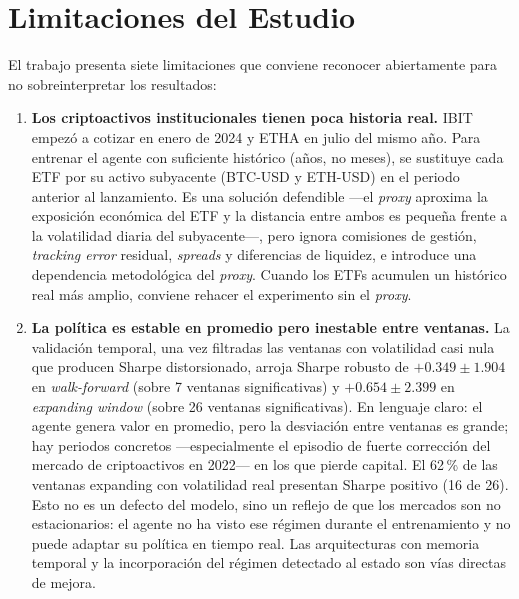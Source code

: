 \documentclass[IB,a4paper]{TFUOC}
\begin{document}
\section{Limitaciones del Estudio}
\label{sec:conclusiones_limitaciones}

El trabajo presenta siete limitaciones que conviene reconocer abiertamente para no sobreinterpretar los resultados:

\begin{enumerate}
    \item \textbf{Los criptoactivos institucionales tienen poca historia real.} IBIT empezó a cotizar en enero de 2024 y ETHA en julio del mismo año. Para entrenar el agente con suficiente histórico (años, no meses), se sustituye cada ETF por su activo subyacente (BTC-USD y ETH-USD) en el periodo anterior al lanzamiento. Es una solución defendible ---el \textit{proxy} aproxima la exposición económica del ETF y la distancia entre ambos es pequeña frente a la volatilidad diaria del subyacente---, pero ignora comisiones de gestión, \textit{tracking error} residual, \textit{spreads} y diferencias de liquidez, e introduce una dependencia metodológica del \textit{proxy}. Cuando los ETFs acumulen un histórico real más amplio, conviene rehacer el experimento sin el \textit{proxy}.

    \item \textbf{La política es estable en promedio pero inestable entre ventanas.} La validación temporal, una vez filtradas las ventanas con volatilidad casi nula que producen Sharpe distorsionado, arroja Sharpe robusto de $+0.349 \pm 1.904$ en \textit{walk-forward} (sobre 7 ventanas significativas) y $+0.654 \pm 2.399$ en \textit{expanding window} (sobre 26 ventanas significativas). En lenguaje claro: el agente genera valor en promedio, pero la desviación entre ventanas es grande; hay periodos concretos —especialmente el episodio de fuerte corrección del mercado de criptoactivos en 2022— en los que pierde capital. El 62\,\% de las ventanas expanding con volatilidad real presentan Sharpe positivo (16 de 26). Esto no es un defecto del modelo, sino un reflejo de que los mercados son no estacionarios: el agente no ha visto ese régimen durante el entrenamiento y no puede adaptar su política en tiempo real. Las arquitecturas con memoria temporal y la incorporación del régimen detectado al estado son vías directas de mejora.


\end{enumerate}
\end{document}
